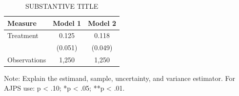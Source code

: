 \providecommand{\sym}[1]{\rlap{\textsuperscript{#1}}}
\begin{table}[!htbp]
\centering
\caption{SUBSTANTIVE TITLE}
\label{tab:LABEL}
\begin{threeparttable}
\begin{tabular*}{4.8in}{@{\extracolsep{\fill}} l S[table-format=-1.3,table-space-text-post={**}] S[table-format=-1.3,table-space-text-post={**}]}
\toprule
{Measure} & {Model 1} & {Model 2} \\
\midrule
Treatment & 0.125\sym{*} & 0.118\sym{*} \\
          & {(0.051)} & {(0.049)} \\
\midrule
Observations & {1,250} & {1,250} \\
\bottomrule
\end{tabular*}
\begin{tablenotes}[flushleft]
\footnotesize
\item Note: Explain the estimand, sample, uncertainty, and variance estimator. For AJPS use: \textdagger{}p < .10; *p < .05; **p < .01.
\end{tablenotes}
\end{threeparttable}
\end{table}
